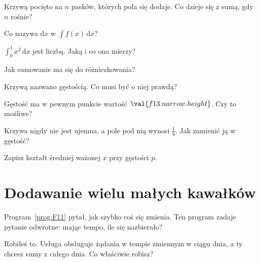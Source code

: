 \begin{quiz}
\item Krzywą pocięto na $n$ pasków, których pola się dodaje. Co dzieje się z
  sumą, gdy $n$ rośnie? 
\item Co nazywa $\mathrm{d}x$ w $\int f(x)\,\mathrm{d}x$?
\item $\int_{0}^{1} x^{2}\,\mathrm{d}x$ jest liczbą. Jaką i co ona mierzy?
\item Jak sumowanie ma się do różniczkowania? 
\item Krzywą nazwano gęstością. Co musi być o niej prawdą?
\item Gęstość ma w pewnym punkcie wartość $\val{f13.narrow.height}$. Czy to
  możliwe? 
\item Krzywa nigdy nie jest ujemna, a pole pod nią wynosi
  $\frac{1}{6}$. Jak zamienić ją w gęstość?
\item Zapisz kształt średniej ważonej $x$ przy gęstości $p$.
\end{quiz}

\section{Dodawanie wielu małych kawałków}
\label{sec:F13-accumulate}

\begin{fr}
Program~\ref{prog:F11} pytał, jak szybko coś się zmienia. Ten program zadaje
pytanie odwrotne: mając tempo, ile się nazbierało?

Robiłeś to. Usługa obsługuje żądania w tempie zmiennym w ciągu dnia, a ty
chcesz sumy z całego dnia. Co właściwie robisz?
\nextframe
\end{fr}

